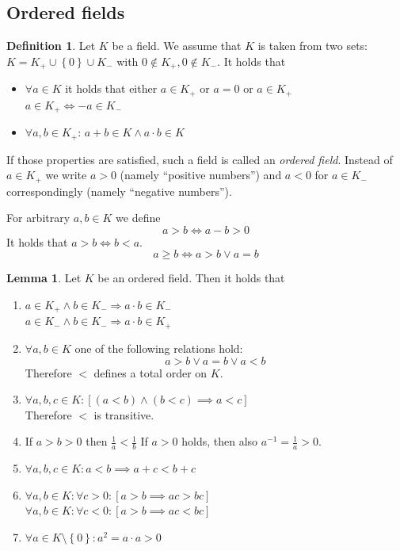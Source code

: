 \documentclass[a4paper,landscape,twocolumn]{article}
\theoremstyle{definition}
\newtheorem{defi}{Definition}
\newtheorem{lemma}{Lemma}
\newcommand\set[1]{\left\{#1\right\}}
\begin{document}
\subsection{Ordered fields}
\begin{defi}
  Let $K$ be a field. We assume that $K$ is taken from two sets: $K = K_+ \cup \set{0} \cup K_-$
  with $0 \not\in K_+, 0 \not\in K_-$. It holds that
  \begin{itemize}
    \item $\forall a \in K$ it holds that either $a \in K_+$ or $a = 0$ or $a \in K_+$ \\
          $a \in K_+ \Leftrightarrow -a \in K_-$
    \item $\forall a, b \in K_+$: $a + b \in K \land a\cdot b \in K$
  \end{itemize}
  If those properties are satisfied, such a field is called an \emph{ordered field}.
  Instead of $a \in K_+$ we write $a > 0$ (namely \enquote{positive numbers})
  and $a < 0$ for $a \in K_-$ correspondingly (namely \enquote{negative numbers}).

  For arbitrary $a, b \in K$ we define
  \[ a > b \Leftrightarrow a - b > 0 \]
  It holds that $a > b \Leftrightarrow b < a$.
  \[ a \geq b \Leftrightarrow a > b \lor a = b \]
\end{defi}

\begin{lemma}
  Let $K$ be an ordered field. Then it holds that
  \begin{enumerate}
    \item $a \in K_+ \land b \in K_- \Rightarrow a \cdot b \in K_-$ \\
          $a \in K_- \land b \in K_- \Rightarrow a \cdot b \in K_+$
    \item $\forall a, b \in K$ one of the following relations hold:
          \[ a > b \lor a = b \lor a < b \]
          Therefore $<$ defines a total order on $K$.
    \item $\forall a, b, c \in K: \left[(a < b) \land (b < c) \implies a < c\right]$ \\
          Therefore $<$ is transitive.
    \item If $a > b > 0$ then $\frac1a < \frac1b$
          If $a > 0$ holds, then also $a^{-1} = \frac1a > 0$.
    \item $\forall a, b, c \in K: a < b \implies a + c < b + c$
    \item $\forall a, b \in K: \forall c > 0: \left[a > b \implies ac > bc\right]$ \\
          $\forall a, b \in K: \forall c < 0: \left[a > b \implies ac < bc\right]$
    \item $\forall a \in K \setminus \set{0}: a^2 = a \cdot a > 0$
  \end{enumerate}
\end{lemma}
\end{document}

